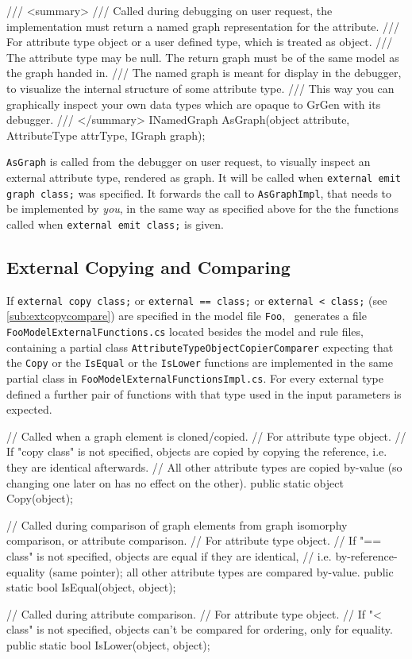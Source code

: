 \begin{csharplet}
/// <summary>
/// Called during debugging on user request, the implementation must return a named graph representation for the attribute.
/// For attribute type object or a user defined type, which is treated as object.
/// The attribute type may be null. The return graph must be of the same model as the graph handed in.
/// The named graph is meant for display in the debugger, to visualize the internal structure of some attribute type.
/// This way you can graphically inspect your own data types which are opaque to GrGen with its debugger.
/// </summary>
INamedGraph AsGraph(object attribute, AttributeType attrType, IGraph graph);
\end{csharplet}

\texttt{AsGraph} is called from the debugger on user request, to visually inspect an external attribute type, rendered as graph.
It will be called when \texttt{external emit graph class;} was specified.
It forwards the call to \texttt{AsGraphImpl}, that needs to be implemented by \emph{you}, in the same way as specified above for the the functions called when \texttt{external emit class;} is given.

\subsection*{External Copying and Comparing}\label{sub:apiextcopycompare}
If \texttt{external copy class;} or \texttt{external == class;} or \texttt{external < class;} (see \ref{sub:extcopycompare}) are specified in the model file \texttt{Foo},
\GrG~generates a file \texttt{FooModelExternalFunctions.cs} located besides the model and rule files,
containing a partial class \texttt{AttributeTypeObjectCopierComparer} expecting that the \texttt{Copy} or the \texttt{IsEqual} or the \texttt{IsLower} functions are implemented in the same partial class in \texttt{FooModelExternalFunctionsImpl.cs}.
For every external type defined a further pair of functions with that type used in the input parameters is expected.

\begin{csharplet}
// Called when a graph element is cloned/copied.
// For attribute type object.
// If "copy class" is not specified, objects are copied by copying the reference, i.e. they are identical afterwards.
// All other attribute types are copied by-value (so changing one later on has no effect on the other).
public static object Copy(object);

// Called during comparison of graph elements from graph isomorphy comparison, or attribute comparison.
// For attribute type object.
// If "== class" is not specified, objects are equal if they are identical,
// i.e. by-reference-equality (same pointer); all other attribute types are compared by-value.
public static bool IsEqual(object, object);

// Called during attribute comparison.
// For attribute type object.
// If "< class" is not specified, objects can't be compared for ordering, only for equality.
public static bool IsLower(object, object);
\end{csharplet}

